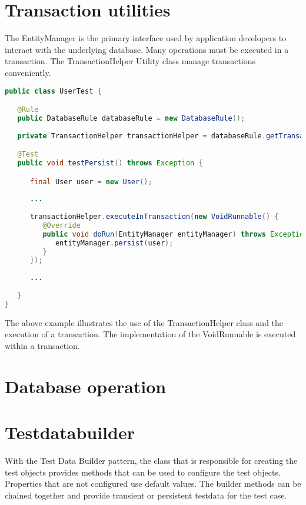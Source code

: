 \section{Transaction utilities}

The EntityManager is the primary interface used by application developers to interact with the underlying database. Many operations must be executed in a transaction.
The TransactionHelper Utility class manage transactions conveniently.

\begin{lstlisting}[language={JAVA},caption=Transaction utilities]
public class UserTest {

   @Rule
   public DatabaseRule databaseRule = new DatabaseRule();
   
   private TransactionHelper transactionHelper = databaseRule.getTransactionHelper();

   @Test
   public void testPersist() throws Exception {

      final User user = new User();
      
      ...
      
      transactionHelper.executeInTransaction(new VoidRunnable() {
         @Override
         public void doRun(EntityManager entityManager) throws Exception {
            entityManager.persist(user);
         }
      });
      
      ...
      
   }
}
\end{lstlisting}

The above example illustrates the use of the TransactionHelper class and the execution of a transaction. The implementation of the VoidRunnable is executed within a transaction.

\section{Database operation}


\section{Testdatabuilder}

With the Test Data Builder pattern, the class that is responsible for creating the test objects provides methods that can be used to configure the test objects. Properties that are not configured use default values. The builder methods can be chained together and provide transient or persistent testdata for the test case.

